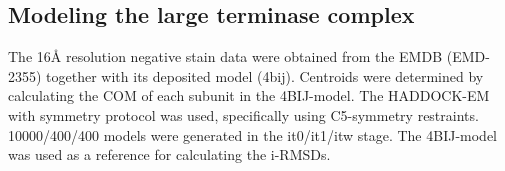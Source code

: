 \subsection{Modeling the large terminase complex}

The 16Å resolution negative stain data were obtained from the EMDB (EMD-2355) together with its deposited model (4bij). 
Centroids were determined by calculating the COM of each subunit in the 4BIJ-model. 
The HADDOCK-EM with symmetry protocol was used, specifically using C5-symmetry restraints. 
10000/400/400 models were generated in the it0/it1/itw stage. 
The 4BIJ-model was used as a reference for calculating the i-RMSDs. 

